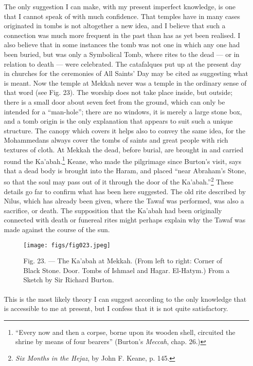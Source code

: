 \documentclass[a4paper, 11pt, oneside, polutonikogreek, english]{article}
\begin{document}
The only suggestion I can make, with my present imperfect knowledge, is one that I cannot speak of with much confidence. That temples have in many cases originated in tombs is not altogether a new idea, and I believe that such a connection was much more frequent in the past than has as yet been realised. I also believe that in some instances the tomb was not one in which any one had been buried, but was only a Symbolical Tomb, where rites to the dead --- or in relation to death --- were celebrated. The catafalques put up at the present day in churches for the ceremonies of All Saints' Day may be cited as suggesting what is meant. Now the temple at Mekkah never was a temple in the ordinary sense of that word (see Fig. 23). The worship does not take place inside, but outside; there is a small door about seven feet from the ground, which can only be intended for a ``man-hole''; there are no windows, it is merely a large stone box, and a tomb origin is the only explanation that appears to suit such a unique structure. The canopy which covers it helps also to convey the same idea, for the Mohammedans always cover the tombs of saints and great people with rich textures of cloth. At Mekkah the dead, before burial, are brought in and carried round the Ka'abah.\footnote{``Every now and then a corpse, borne upon its wooden shell, circuited the shrine by means of four bearers'' (Burton's \emph{Meccah}, chap. 26.)} Keane, who made the pilgrimage since Burton's visit, says that a dead body is brought into the Haram, and placed ``near Abraham's Stone, so that the soul may pass out of it through the door of the Ka'abah.''\footnote{\emph{Six Months in the Hejaz}, by John F. Keane, p. 145.} These details go far to confirm what has been here suggested. The old rite described by Nilus, which has already been given, where the Tawaf was performed, was also a sacrifice, or death. The supposition that the Ka'abah had been originally connected with death or funereal rites might perhaps explain why the Tawaf was made against the course of the sun.

\begin{figure}[H]
\centering
\texttt{[image: figs/fig023.jpeg]}
\caption[Fig. 23. --- The Ka'abah at Mekkah.]{Fig. 23. --- The Ka'abah at Mekkah. (From left to right: Corner of Black Stone. Door. Tombs of Ishmael and Hagar. El-Hatym.) From a Sketch by Sir Richard Burton.}
\end{figure}
\paragraph{}
This is the most likely theory I can suggest according to the only knowledge that is accessible to me at present, but I confess that it is not quite satisfactory.
\end{document}
